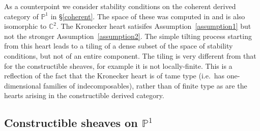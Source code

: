 \documentclass{article}
\theoremstyle{plain}
\theoremstyle{definition}
\theoremstyle{remark}
\newcommand{\ie}{i.e.\ }
\newcommand{\C}{\mathbb{C}}
\renewcommand{\P}{\mathbb{P}}
\begin{document}
As a counterpoint we consider stability conditions on the coherent derived category of $\P^1$ in \S\ref{coherent}. The space of these was computed in \cite{MR2219846} and is also isomorphic to $\C^2$. The Kronecker heart satisifes Assumption~\ref{assumption1} but not the stronger Assumption~\ref{assumption2}. The simple tilting process starting from this heart leads to a tiling of a dense subset of the space of stability conditions, but not of an entire component. The tiling is very different from that for the constructible sheaves, for example it is not locally-finite. This is a reflection of the fact that the Kronecker heart is of tame type (\ie has one-dimensional families of indecomposables), rather than of finite type as are the hearts arising in the constructible derived category. 

\subsection{Constructible sheaves on $\P^1$}
\label{constructible}
\end{document}
